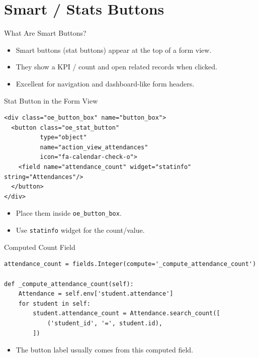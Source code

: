 \section{Smart / Stats Buttons}

\begin{frame}{What Are Smart Buttons?}
	\begin{itemize}
		\item Smart buttons (stat buttons) appear at the top of a form view.
		\item They show a KPI / count and open related records when clicked.
		\item Excellent for navigation and dashboard-like form headers.
	\end{itemize}
\end{frame}

\begin{frame}[fragile]{Stat Button in the Form View}
\begin{lstlisting}[style=xml]
<div class="oe_button_box" name="button_box">
  <button class="oe_stat_button"
		  type="object"
		  name="action_view_attendances"
		  icon="fa-calendar-check-o">
	<field name="attendance_count" widget="statinfo" string="Attendances"/>
  </button>
</div>
\end{lstlisting}
	\begin{itemize}
		\item Place them inside \texttt{oe\_button\_box}.
		\item Use \texttt{statinfo} widget for the count/value.
	\end{itemize}
\end{frame}

\begin{frame}[fragile]{Computed Count Field}
\begin{lstlisting}
attendance_count = fields.Integer(compute='_compute_attendance_count')

def _compute_attendance_count(self):
	Attendance = self.env['student.attendance']
	for student in self:
		student.attendance_count = Attendance.search_count([
			('student_id', '=', student.id),
		])
\end{lstlisting}
	\begin{itemize}
		\item The button label usually comes from this computed field.
	\end{itemize}
\end{frame}

